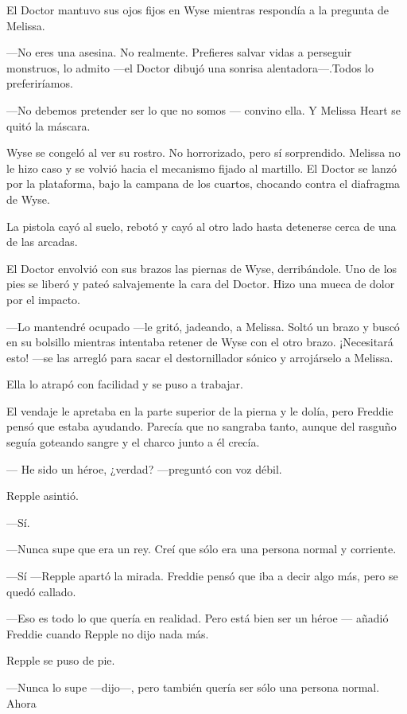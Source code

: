 {El Doctor mantuvo sus ojos fijos en Wyse mientras respondía a la
pregunta de Melissa.}

{---No eres una asesina. No realmente. Prefieres salvar vidas a
	perseguir monstruos, lo admito ---el Doctor dibujó una sonrisa
alentadora---.Todos lo preferiríamos.}

{---No debemos pretender ser lo que no somos --- convino ella. Y Melissa
Heart se quitó la máscara.}

{Wyse se congeló al ver su rostro. No horrorizado, pero sí sorprendido.
	Melissa no le hizo caso y se volvió hacia el mecanismo fijado al
	martillo. El Doctor se lanzó por la plataforma, bajo la campana de los
cuartos, chocando contra el diafragma de Wyse.}

{La pistola cayó al suelo, rebotó y cayó al otro lado hasta detenerse
cerca de una de las arcadas.}

{El Doctor envolvió con sus brazos las piernas de Wyse, derribándole.
	Uno de los pies se liberó y pateó salvajemente la cara del Doctor. Hizo
una mueca de dolor por el impacto.}

{---Lo mantendré ocupado ---le gritó, jadeando, a Melissa. Soltó un
	brazo y buscó en su bolsillo mientras intentaba retener de Wyse con el
	otro brazo. ¡Necesitará esto! ---se las arregló para sacar el
destornillador sónico y arrojárselo a Melissa.}

{Ella lo atrapó con facilidad y se puso a trabajar.}

{}

{El vendaje le apretaba en la parte superior de la pierna y le dolía,
	pero Freddie pensó que estaba ayudando. Parecía que no sangraba tanto,
	aunque del rasguño seguía goteando sangre y el charco junto a él
crecía.}

{--- He sido un héroe, ¿verdad? ---preguntó con voz débil.}

{Repple asintió.}

{---Sí.}

{---Nunca supe que era un rey. Creí que sólo era una persona normal y
corriente.}

{---Sí ---Repple apartó la mirada. Freddie pensó que iba a decir algo
más, pero se quedó callado.}

{---Eso es todo lo que quería en realidad. Pero está bien ser un héroe
--- añadió Freddie cuando Repple no dijo nada más.}

{Repple se puso de pie.}

{---Nunca lo supe ---dijo---, pero también quería ser sólo una persona
normal. Ahora}

